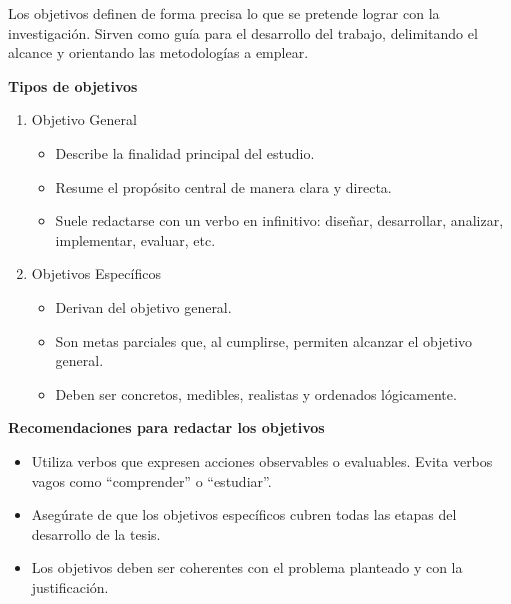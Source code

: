 Los objetivos definen de forma precisa lo que se pretende lograr con la investigación. Sirven como guía para el desarrollo del trabajo, delimitando el alcance y orientando las metodologías a emplear.

\textbf{Tipos de objetivos}

\begin{enumerate}
    \item Objetivo General
    \begin{itemize}
        \item Describe la finalidad principal del estudio.
        \item Resume el propósito central de manera clara y directa.
        \item Suele redactarse con un verbo en infinitivo: diseñar, desarrollar, analizar, implementar, evaluar, etc.
    \end{itemize}
    \item Objetivos Específicos
    \begin{itemize}
        \item Derivan del objetivo general.
        \item Son metas parciales que, al cumplirse, permiten alcanzar el objetivo general.
        \item Deben ser concretos, medibles, realistas y ordenados lógicamente.
    \end{itemize}

\end{enumerate}

\textbf{Recomendaciones para redactar los objetivos}

\begin{itemize}
    \item Utiliza verbos que expresen acciones observables o evaluables. Evita verbos vagos como ``comprender'' o ``estudiar''.
    \item Asegúrate de que los objetivos específicos cubren todas las etapas del desarrollo de la tesis.
    \item Los objetivos deben ser coherentes con el problema planteado y con la justificación.
\end{itemize}